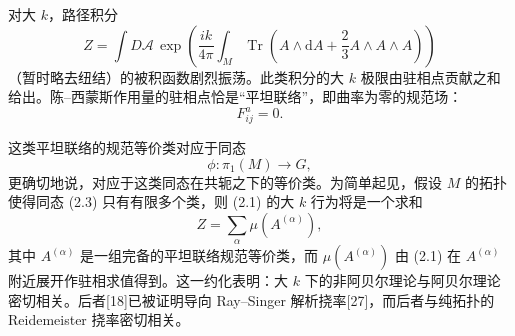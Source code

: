 \documentclass[11pt,a4paper]{article}
\begin{document}
对大 $k$，路径积分
\begin{equation}
    Z=\int D\mathcal{A}\,\exp\left(\frac{ik}{4\pi}\int_M\operatorname{Tr}\left(A\wedge\mathrm{d}A+\frac{2}{3}A\wedge A\wedge A\right)\right)
    \tag{2.1}
\end{equation}
（暂时略去纽结）的被积函数剧烈振荡。此类积分的大 $k$ 极限由驻相点贡献之和给出。陈–西蒙斯作用量的驻相点恰是“平坦联络”，即曲率为零的规范场：
\begin{equation}
    F^a_{ij}=0.
    \tag{2.2}
\end{equation}


这类平坦联络的规范等价类对应于同态
\begin{equation}
    \phi\colon \pi_1(M)\to G,
    \tag{2.3}
\end{equation}
更确切地说，对应于这类同态在共轭之下的等价类。为简单起见，假设 $M$ 的拓扑使得同态 (2.3) 只有有限多个类，则 (2.1) 的大 $k$ 行为将是一个求和
\begin{equation}
    Z=\sum_\alpha \mu(A^{(\alpha)}),
    \tag{2.4}
\end{equation}
其中 $A^{(\alpha)}$ 是一组完备的平坦联络规范等价类，而 $\mu(A^{(\alpha)})$ 由 (2.1) 在 $A^{(\alpha)}$ 附近展开作驻相求值得到。这一约化表明：大 $k$ 下的非阿贝尔理论与阿贝尔理论密切相关。后者[18]已被证明导向 Ray--Singer 解析挠率[27]，而后者与纯拓扑的 Reidemeister 挠率密切相关。

\end{document}
